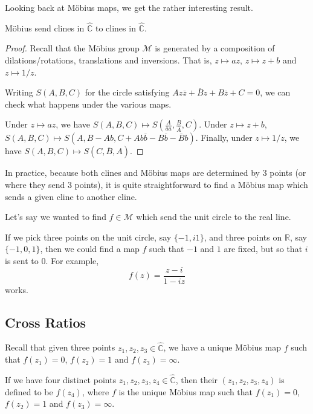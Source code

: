 \documentclass[a4paper]{scrartcl}
\begin{document}
Looking back at Möbius maps, we get the rather interesting result.
\begin{theorem}
	Möbius send clines in $\hat{\mathbb{C}}$ to clines in $\hat{\mathbb{C}}$.
\end{theorem}
\begin{proof}
	Recall that the Möbius group $\mathcal{M}$ is generated by a composition of dilations/rotations, translations and inversions. That is, $z \mapsto az$, $z \mapsto z + b$ and $z \mapsto 1/z$.

	Writing $S(A, B, C)$ for the circle satisfying $A z \overline{z} + \overline{B}z + B \overline{z} + C = 0$, we can check what happens under the various maps.

	Under $z \mapsto az$, we have $S(A, B, C) \mapsto S\left(\frac{A}{\overline{a}a}, \frac{B}{\overline{A}}, C\right)$. Under $z \mapsto z + b$, $S(A, B, C) \mapsto S(A, B - Ab, C + A b \overline{b} - B \overline{b} - \overline{B} b)$. Finally, under $z \mapsto 1/z$, we have $S(A, B, C) \mapsto S(C, \overline{B}, A)$.
\end{proof}

In practice, because both clines and Möbius maps are determined by 3 points (or where they send 3 points), it is quite straightforward to find a Möbius map which sends a given cline to another cline.

\begin{example}
	Let's say we wanted to find $f \in \mathcal{M}$ which send the unit circle to the real line.

	If we pick three points on the unit circle, say $\{-1, i 1\}$, and three points on $\mathbb{R}$, say $\{-1, 0, 1\}$, then we could find a map $f$ such that $-1$ and $1$ are fixed, but so that $i$ is sent to $0$. For example,
	$$
	f(z) = \frac{z - i}{1 - iz}
	$$
	works.
\end{example}

\subsection{Cross Ratios}

Recall that given three points $z_1, z_2, z_3 \in \hat{\mathbb{C}}$, we have a unique Möbius map $f$ such that $f(z_1) = 0$, $f(z_2) = 1$ and $f(z_3) = \infty$.

\begin{definition}
	If we have four distinct points $z_1, z_2, z_3, z_4 \in \hat{\mathbb{C}}$, then their  $(z_1, z_2, z_3, z_4)$ is defined to be $f(z_4)$, where $f$ is the unique Möbius map such that $f(z_1) = 0$, $f(z_2) = 1$ and $f(z_3) = \infty$.
\end{definition}
\end{document}
